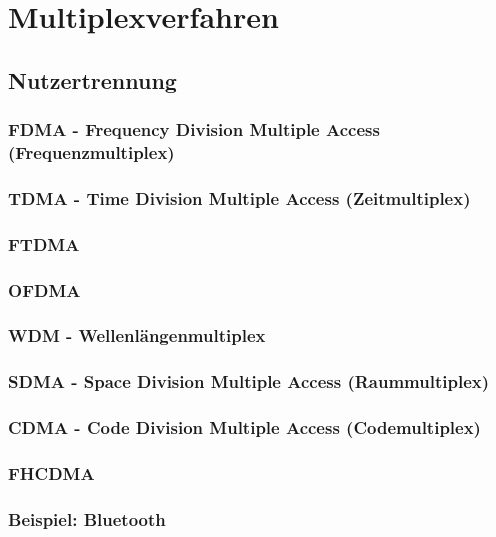 \section{Multiplexverfahren}

\subsection{Nutzertrennung}
\subsubsection{FDMA - Frequency Division Multiple Access (Frequenzmultiplex)}

\subsubsection{TDMA - Time Division Multiple Access (Zeitmultiplex)}
\subsubsection{FTDMA}
\subsubsection{OFDMA}

\subsubsection{WDM - Wellenlängenmultiplex}

\subsubsection{SDMA - Space Division Multiple Access (Raummultiplex)}

\subsubsection{CDMA - Code Division Multiple Access (Codemultiplex)}

\subsubsection{FHCDMA}
\subsubsection*{Beispiel: Bluetooth}

